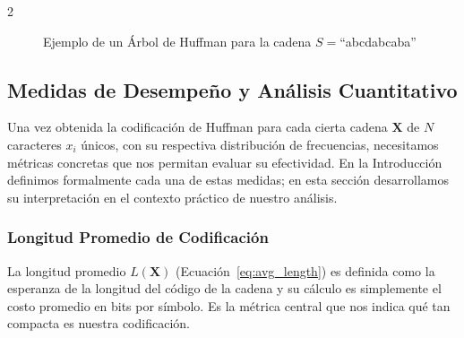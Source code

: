 \documentclass[a4paper, 10pt]{article}
\begin{document}
\begin{multicols}{2}

    \begin{figure}[H]
        \centering
        \caption{Ejemplo de un Árbol de Huffman para la cadena $S=$``abcdabcaba''}
        \label{fig:huffman_tree}
    \end{figure}

    \subsection{Medidas de Desempeño y Análisis Cuantitativo}

        Una vez obtenida la codificación de Huffman para cada cierta cadena $\mathbf{X}$ de $N$ caracteres $x_i$ únicos, con su respectiva distribución de frecuencias, necesitamos métricas concretas que nos permitan evaluar su efectividad. En la Introducción definimos formalmente cada una de estas medidas; en esta sección desarrollamos su interpretación en el contexto práctico de nuestro análisis.

        \subsubsection*{Longitud Promedio de Codificación}

            La longitud promedio $L(\mathbf{X})$ (Ecuación~\eqref{eq:avg_length}) es definida como la esperanza de la longitud del código de la cadena y su cálculo es simplemente el costo promedio en bits por símbolo. Es la métrica central que nos indica qué tan compacta es nuestra codificación.


\end{multicols}
\end{document}
